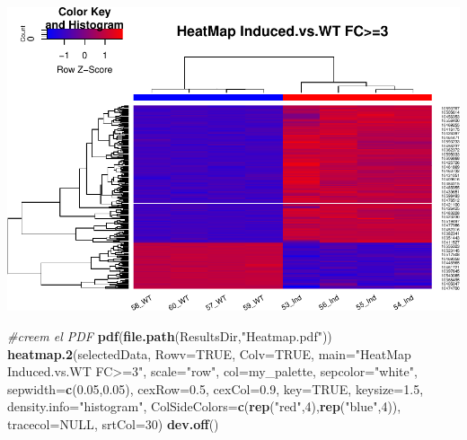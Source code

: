 \documentclass[
]{article}
\newenvironment{Shaded}{\begin{snugshade}}{\end{snugshade}}
\newcommand{\AttributeTok}[1]{\textcolor[rgb]{0.13,0.29,0.53}{#1}}
\newcommand{\CommentTok}[1]{\textcolor[rgb]{0.56,0.35,0.01}{\textit{#1}}}
\newcommand{\ConstantTok}[1]{\textcolor[rgb]{0.56,0.35,0.01}{#1}}
\newcommand{\DecValTok}[1]{\textcolor[rgb]{0.00,0.00,0.81}{#1}}
\newcommand{\FloatTok}[1]{\textcolor[rgb]{0.00,0.00,0.81}{#1}}
\newcommand{\FunctionTok}[1]{\textcolor[rgb]{0.13,0.29,0.53}{\textbf{#1}}}
\newcommand{\NormalTok}[1]{#1}
\newcommand{\StringTok}[1]{\textcolor[rgb]{0.31,0.60,0.02}{#1}}
\begin{document}
\includegraphics{APUNTS_files/figure-latex/heatmap-1.pdf}

\begin{Shaded}
\begin{Highlighting}[]
\CommentTok{\#creem el PDF}
\FunctionTok{pdf}\NormalTok{(}\FunctionTok{file.path}\NormalTok{(ResultsDir,}\StringTok{"Heatmap.pdf"}\NormalTok{))}
\FunctionTok{heatmap.2}\NormalTok{(selectedData,}
          \AttributeTok{Rowv=}\ConstantTok{TRUE}\NormalTok{,}
          \AttributeTok{Colv=}\ConstantTok{TRUE}\NormalTok{,}
          \AttributeTok{main=}\StringTok{"HeatMap Induced.vs.WT FC\textgreater{}=3"}\NormalTok{,}
          \AttributeTok{scale=}\StringTok{"row"}\NormalTok{,}
          \AttributeTok{col=}\NormalTok{my\_palette,}
          \AttributeTok{sepcolor=}\StringTok{"white"}\NormalTok{,}
          \AttributeTok{sepwidth=}\FunctionTok{c}\NormalTok{(}\FloatTok{0.05}\NormalTok{,}\FloatTok{0.05}\NormalTok{),}
          \AttributeTok{cexRow=}\FloatTok{0.5}\NormalTok{,}
          \AttributeTok{cexCol=}\FloatTok{0.9}\NormalTok{,}
          \AttributeTok{key=}\ConstantTok{TRUE}\NormalTok{,}
          \AttributeTok{keysize=}\FloatTok{1.5}\NormalTok{,}
          \AttributeTok{density.info=}\StringTok{"histogram"}\NormalTok{,}
          \AttributeTok{ColSideColors=}\FunctionTok{c}\NormalTok{(}\FunctionTok{rep}\NormalTok{(}\StringTok{"red"}\NormalTok{,}\DecValTok{4}\NormalTok{),}\FunctionTok{rep}\NormalTok{(}\StringTok{"blue"}\NormalTok{,}\DecValTok{4}\NormalTok{)),}
          \AttributeTok{tracecol=}\ConstantTok{NULL}\NormalTok{,}
          \AttributeTok{srtCol=}\DecValTok{30}\NormalTok{)}
\FunctionTok{dev.off}\NormalTok{()}
\end{Highlighting}
\end{Shaded}
\end{document}

